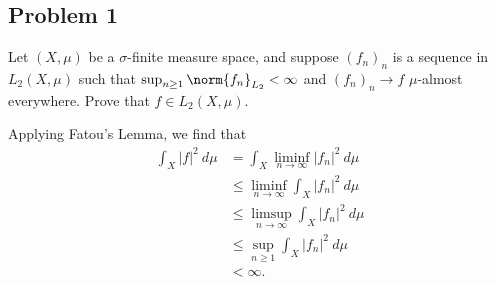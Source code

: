 \documentclass[10pt]{mypackage}
\begin{document}
\subsection{Problem 1}%
\begin{problem}
  Let $\left( X,\mu \right)$ be a $\sigma$-finite measure space, and suppose $\left( f_n \right)_n$ is a sequence in $L_2\left( X,\mu \right)$ such that $\sup_{n\geq 1}\norm{f_n}_{L_2} < \infty$ and $\left( f_n \right)_n\rightarrow f$ $\mu$-almost everywhere. Prove that $f\in L_2\left( X,\mu \right)$.
\end{problem}
Applying Fatou's Lemma, we find that
\begin{align*}
  \int_{X}^{} \left\vert f \right\vert^2\:d\mu &= \int_{X}^{} \liminf_{n\rightarrow\infty}\left\vert f_n \right\vert^2\:d\mu\\
                                               &\leq \liminf_{n\rightarrow\infty} \int_{X}^{} \left\vert f_n \right\vert^2\:d\mu\\
                                               &\leq \limsup_{n\rightarrow\infty} \int_{X}^{} \left\vert f_n \right\vert^2\:d\mu\\
                                               &\leq \sup_{n\geq 1} \int_{X}^{} \left\vert f_n \right\vert^2\:d\mu\\
                                               &< \infty.
\end{align*}
\end{document}
